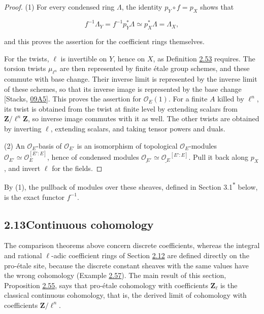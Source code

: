 \documentclass[11pt]{article}
\newcommand{\bpout}[1]{#1\textsuperscript{\hyperlink{bp-outside}{\ensuremath{\ast}}}}
\begin{document}
\begin{proof}[{Proof}]\label{bp166}%
(1) For every condensed ring \(\Lambda\), the identity \(p_Y\circ f=p_X\) shows that

\[
f^{-1}\Lambda_Y=f^{-1}p_Y^*\Lambda\simeq p_X^*\Lambda=\Lambda_X,
\]

and this proves the assertion for the coefficient rings themselves.

For the twists, \(\ell\) is invertible on \(Y\), hence on \(X\), as Definition \hyperref[bp162]{2.53} requires. The torsion twists \(\mu_{\ell^n}\) are then represented by finite étale group schemes, and these commute with base change. Their inverse limit is represented by the inverse limit of these schemes, so that its inverse image is represented by the base change [Stacks, \href{https://stacks.math.columbia.edu/tag/09A5}{09A5}]. This proves the assertion for \(\mathcal O_E(1)\). For a finite \(A\) killed by \(\ell^n\), its twist is obtained from the twist at finite level by extending scalars from \(\mathbf Z/\ell^n\mathbf Z\), so inverse image commutes with it as well. The other twists are obtained by inverting \(\ell\), extending scalars, and taking tensor powers and duals.

(2) An \(\mathcal O_E\)-basis of \(\mathcal O_{E'}\) is an isomorphism of topological \(\mathcal O_E\)-modules \(\mathcal O_{E'}\simeq\mathcal O_E^{[E':E]}\), hence of condensed modules \(\underline{\mathcal O_{E'}}\simeq\underline{\mathcal O_E}^{[E':E]}\). Pull it back along \(p_X\), and invert \(\ell\) for the fields.
\end{proof}

\label{bp167}%
By (1), the pullback of modules over these sheaves, defined in Section \bpout{3.1} below, is the exact functor \(f^{-1}\).



\subsection*{\texorpdfstring{2.13\quad Continuous cohomology}{2.13 Continuous cohomology}}
\label{bp168}%
\label{bp169}%
The comparison theorems above concern discrete coefficients, whereas the integral and rational \(\ell\)-adic coefficient rings of Section \hyperref[bp147]{2.12} are defined directly on the pro-étale site, because the discrete constant sheaves with the same values have the wrong cohomology (Example \hyperref[bp176]{2.57}). The main result of this section, Proposition \hyperref[bp170]{2.55}, says that pro-étale cohomology with coefficients \(\mathbf Z_\ell\) is the classical continuous cohomology, that is, the derived limit of cohomology with coefficients \(\mathbf Z/\ell^n\).
\end{document}
